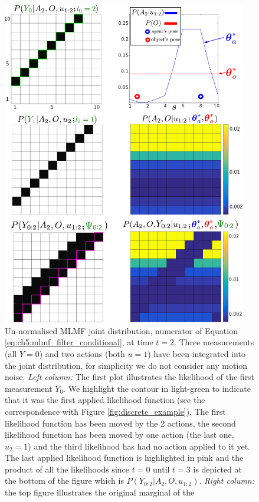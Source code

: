 \begin{figure}
 \centering
 \includegraphics[width=0.95\textwidth]{./ch5-MLMF/Figures/explenation/example_marginal.pdf}
 \caption{Un-normalised MLMF joint distribution, numerator of Equation \ref{eq:ch5:mlmf_filter_conditional}, at time $t=2$.
 Three measurements (all $Y=0$) and two actions (both $u=1$) have been integrated into the joint distribution, for simplicity we do not consider any motion noise. \textit{Left column:} The first plot
 illustrates the likelihood of the first measurement $Y_0$. We highlight the contour in light-green to indicate that it was the first applied likelihood 
 function (see the correspondence with Figure \ref{fig:discrete_example}). The first likelihood function has been moved by the 2 actions, the 
 second likelihood function has been moved by one action (the last one, $u_2=1$) and the third likelihood has had no action applied to it 
 yet. The last applied likelihood function is highlighted in pink and the product of all the likelihoods since $t=0$ until $t=3$ is depicted at the 
 bottom of the figure which is $P(Y_{0:2}|A_2,O,u_{1:2})$. \textit{Right column:} the top figure illustrates the original marginal of the 
}
\end{figure}
